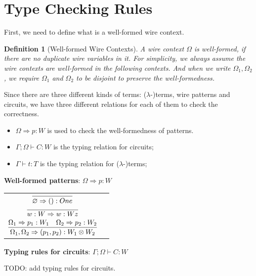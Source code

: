 \documentclass[12pt]{article}
\newtheorem{Def}{Definition}
\begin{document}
\section{Type Checking Rules}
First, we need to define what is a well-formed wire context.
\begin{Def}[Well-formed Wire Contexts]
  A wire context $\Omega$ is well-formed, if there are no duplicate wire variables in it.
  For simplicity, we always assume the wire contexts are well-formed in the following contexts. And when we write $\Omega_1, \Omega_2$, we require $\Omega_1$ and $\Omega_2$ to be disjoint to preserve the well-formedness.
\end{Def}

Since there are three different kinds of terms: ($\lambda$-)terms, wire patterns and circuits, we have three different relations for each of them to check the correctness.
\begin{itemize}
  \item $\Omega \Rightarrow p : W$ is used to check the well-formedness of patterns.
  \item $\Gamma ; \Omega \vdash C : W$ is the typing relation for circuits;
  \item $\Gamma \vdash t:T$ is the typing relation for ($\lambda$-)terms;
\end{itemize}

\noindent \textbf{Well-formed patterns}: $\boxed{\Omega \Rightarrow p : W}$

\renewcommand\arraystretch{2.5}
\begin{longtable}[c]{cr}
  $ \infer{\varnothing \To ():One}{}$ & \\
  $ \infer{w:W \To w:Wz}{}$ & \\
  $ \infer{\Omega_1, \Omega_2 \Rightarrow (p_1,p_2):W_1\otimes W_2}{\Omega_1 \To p_1 : W_1  &\Omega_2 \To p_2 : W_2} $ & \\
\end{longtable}

\noindent \textbf{Typing rules for circuits}: $\boxed{\Gamma;\Omega\vdash C:W}$

{\color{red} TODO: add typing rules for circuits.}

\end{document}
